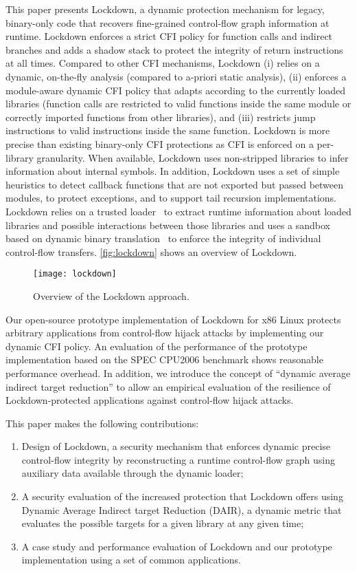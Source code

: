 \documentclass{acm_proc_article-sp}
\begin{document}
This paper presents Lockdown, a dynamic protection mechanism for legacy,
binary-only code that recovers fine-grained control-flow graph information at
runtime.  Lockdown enforces a strict CFI policy for function calls and indirect
branches and adds a shadow stack to protect the integrity of return instructions
at all times. Compared to other CFI mechanisms, Lockdown (i) relies on a dynamic,
on-the-fly analysis (compared to a-priori static analysis), (ii) enforces a
module-aware dynamic CFI policy that adapts according to the currently loaded
libraries (function calls are restricted to valid functions inside the same
module or correctly imported functions from other libraries), and (iii)
restricts jump instructions to valid instructions inside the same function.
Lockdown is more precise than existing binary-only CFI protections as CFI is
enforced on a per-library granularity. When available, Lockdown uses
non-stripped libraries to infer information about internal symbols.
In addition, Lockdown uses a set of simple
heuristics to detect callback functions that are not exported but passed between
modules, to protect exceptions, and to support tail recursion implementations.
Lockdown relies on a trusted loader~\cite{secuLoader} to extract runtime
information about loaded libraries and possible interactions between those
libraries and uses a sandbox based on dynamic binary translation~\cite{libdetox}
to enforce the integrity of individual control-flow transfers.
\autoref{fig:lockdown} shows an overview of Lockdown.

\begin{figure}[t]
  \begin{center}
    \texttt{[image: lockdown]}
    \caption{Overview of the Lockdown approach.}
    \label{fig:lockdown}
  \end{center}
\end{figure}

Our open-source prototype implementation of Lockdown for x86 Linux protects
arbitrary applications from control-flow hijack attacks by implementing our
dynamic CFI policy. An evaluation of the performance of the prototype
implementation based on the SPEC CPU2006 benchmark shows reasonable performance overhead. 
In addition, we introduce the concept of ``dynamic average indirect target reduction''
to allow an empirical evaluation of the resilience of
Lockdown-protected applications against control-flow hijack attacks.

This paper makes the following contributions:
\begin{enumerate}
\item Design of Lockdown, a security mechanism that enforces dynamic precise
control-flow integrity by reconstructing a runtime control-flow graph using
auxiliary data available through the dynamic loader;
\item A security evaluation of the increased protection that Lockdown offers
using Dynamic Average Indirect target Reduction (DAIR), a dynamic metric that
evaluates the possible targets for a given library at any given time;
\item A case study and performance evaluation of Lockdown and our prototype
implementation using a set of common applications. \end{enumerate}
\end{document}
